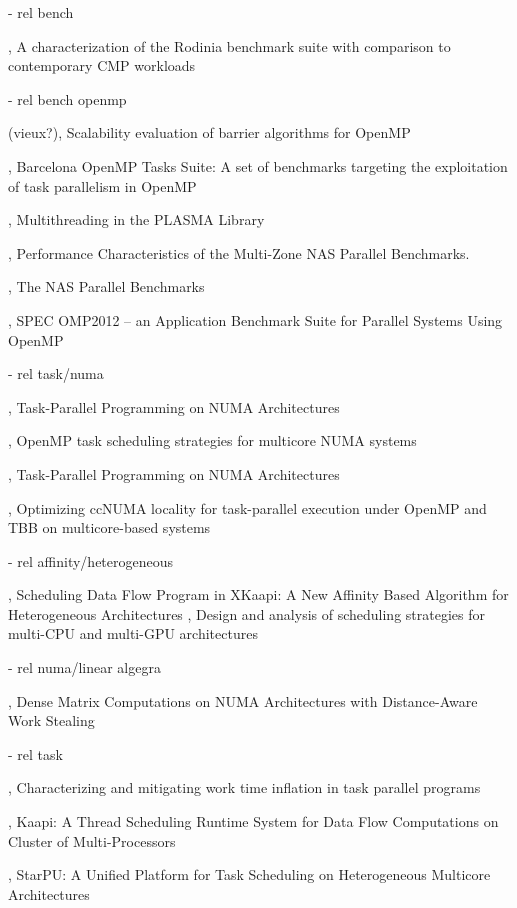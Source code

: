   - rel bench

\cite{Rodinia2010}, A characterization of the Rodinia benchmark suite with comparison to contemporary CMP workloads

  - rel bench openmp

(vieux?)\cite{Nanjegowda2009}, Scalability evaluation of barrier algorithms for OpenMP

\cite{Duran2009}, Barcelona OpenMP Tasks Suite: A set of benchmarks targeting the exploitation of task parallelism in OpenMP

\cite{Kurzak2013}, Multithreading in the PLASMA Library

\cite{Jin2004}, Performance Characteristics of the Multi-Zone NAS Parallel Benchmarks.

\cite{Bailey1994}, The NAS Parallel Benchmarks

\cite{Muller2012}, SPEC OMP2012 -- an Application Benchmark Suite for Parallel Systems Using OpenMP

  - rel task/numa

\cite{Wienke2012}, Task-Parallel Programming on NUMA Architectures

\cite{Olivier2012}, OpenMP task scheduling strategies for multicore NUMA systems

\cite{Terboven2012}, Task-Parallel Programming on NUMA Architectures

\cite{Wittmann2011}, Optimizing ccNUMA locality for task-parallel execution under OpenMP and TBB on multicore-based systems


  - rel affinity/heterogeneous

\cite{Bleuse2014}, Scheduling Data Flow Program in XKaapi: A New Affinity Based Algorithm for Heterogeneous Architectures
\cite{Lima2015}, Design and analysis of scheduling strategies for multi-CPU and multi-GPU architectures

  - rel numa/linear algegra

\cite{Al-Omairy2015}, Dense Matrix Computations on NUMA Architectures with Distance-Aware Work Stealing

  - rel task

\cite{Olivier2013}, Characterizing and mitigating work time inflation in task parallel programs

\cite{Gautier2007}, Kaapi: A Thread Scheduling Runtime System for Data Flow Computations on Cluster of Multi-Processors

\cite{StarPU}, StarPU: A Unified Platform for Task Scheduling on Heterogeneous Multicore Architectures

